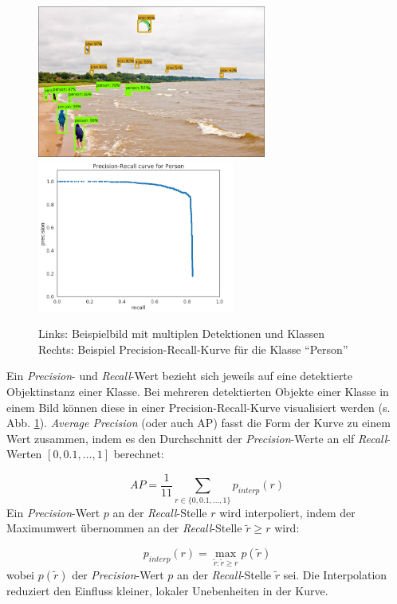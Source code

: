 \begin{figure}[ht]
  \centering
  \includegraphics[height=5cm]{pics/kites.jpg}
  \hspace{.5cm}
  \includegraphics[height=5cm]{pics/precision-recall-kurve.png}
  \caption[Precision-Recall-Kurve]{Links: Beispielbild mit multiplen Detektionen und Klassen\cite{ref:arlen}\\Rechts: Beispiel Precision-Recall-Kurve für die Klasse ``Person''\cite{ref:huang}}
  \label{fig:precision-recall}
\end{figure}
\noindent
Ein \textit{Precision}- und \textit{Recall}-Wert bezieht sich jeweils auf eine detektierte Objektinstanz einer Klasse. Bei mehreren detektierten Objekte einer Klasse in einem Bild können diese in einer Precision-Recall-Kurve visualisiert werden (s. Abb. \ref{fig:precision-recall}). \textit{Average Precision} (oder auch AP) fasst die Form der Kurve zu einem Wert zusammen, indem es den Durchschnitt der \textit{Precision}-Werte an elf \textit{Recall}-Werten $[0, 0.1, \dots, 1]$ berechnet: 

\begin{equation}\label{equation:ap}
  AP = \frac{1}{11} \sum_{r \in \{0, 0.1, \dots, 1\}}  p_{interp}(r)
\end{equation}
\noindent
Ein \textit{Precision}-Wert $p$ an der \textit{Recall}-Stelle $r$ wird interpoliert, indem der Maximumwert übernommen an der \textit{Recall}-Stelle $\tilde{r}\ge r$ wird:

\begin{equation}\label{equation:pinterp}
  p_{interp}(r) = \max_{\tilde{r}:\tilde{r}\ge r} p (\tilde{r})
\end{equation}
\noindent
wobei $p(\tilde{r})$ der \textit{Precision}-Wert $p$ an der \textit{Recall}-Stelle $\tilde{r}$ sei. Die Interpolation reduziert den Einfluss kleiner, lokaler Unebenheiten in der Kurve.\cite{ref:huang}

